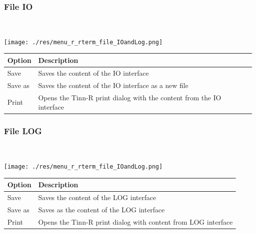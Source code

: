 \hypertarget{menu_r_rterm_file_IO}{}
\subsubsection{File IO}\\

\texttt{[image: ./res/menu\_r\_rterm\_file\_IOandLog.png]}\\

\begin{scriptsize}\begin{tabularx}{\textwidth}{>{\hsize=0.3\hsize}X>{\hsize=0.7\hsize}X}\\
    \hline
    \textbf{Option} & \textbf{Description} \\
    \hline
    Save & Saves the content of the IO interface \\
    Save as & Saves the content of the IO interface as a new file \\
    Print & Opens the Tinn-R print dialog with the content from the IO interface \\
    \hline
  \end{tabularx}\end{scriptsize}


\newpage
\hypertarget{menu_r_rterm_file_Log}{}
\subsubsection{File LOG}\\

\texttt{[image: ./res/menu\_r\_rterm\_file\_IOandLog.png]}\\

\begin{scriptsize}\begin{tabularx}{\textwidth}{>{\hsize=0.3\hsize}X>{\hsize=0.7\hsize}X}\\
    \hline
    \textbf{Option} & \textbf{Description} \\
    \hline
    Save & Saves the content of the LOG interface \\
    Save as & Saves as the content of the LOG interface \\
    Print & Opens the Tinn-R print dialog with content from LOG interface \\
    \hline
  \end{tabularx}\end{scriptsize}


\hypertarget{menu_r_rterm_clear}{}
